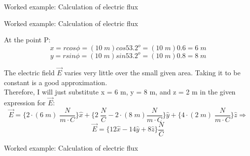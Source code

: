 {\begin{frame}{Worked example: Calculation of electric flux}
\end{frame}

%
%
%

\begin{frame}{Worked example: Calculation of electric flux}

  At the point P:
  \begin{equation*}
     x = r  cos\phi = (10 \; m)  cos53.2^o = (10 \; m)  0.6 = 6 \; m
  \end{equation*}
  \begin{equation*}
     y = r  sin\phi = (10 \; m)  sin53.2^o = (10 \; m)  0.8 = 8 \; m
  \end{equation*}

  \vspace{0.2cm}

  The electric field $\vec{E}$ varies very little over the small given area.
  Taking it to be constant is a good approximation.\\
  Therefore, I will just substitute x = 6 m, y = 8 m, and z = 2 m
  in the given expression for $\vec{E}$:
  \begin{equation*}
   \vec{E} =
     \big\{ 2 \cdot (6\; m) \; \frac{N}{m \cdot C} \big\} \hat{x} +
     \big\{ 2 \; \frac{N}{C} - 2 \cdot (8 \; m) \frac{N}{m \cdot C} \big\} \hat{y} +
     \big\{ 4 \cdot (2\;m) \; \frac{N}{m \cdot C} \big\} \hat{z} \Rightarrow
  \end{equation*}
  \begin{equation*}
   \vec{E} =
   \big\{ 12 \hat{x} - 14 \hat{y} + 8 \hat{z} \big\} \frac{N}{C}
 \end{equation*}

\end{frame}

%
%
%

\begin{frame}{Worked example: Calculation of electric flux}


\end{frame}}

